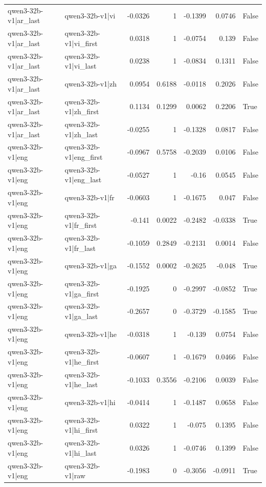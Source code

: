 \begin{table}
\begin{tabular}{l l r r r r l}
qwen3-32b-v1|ar_last & qwen3-32b-v1|vi & -0.0326 & 1 & -0.1399 & 0.0746 & False \\
qwen3-32b-v1|ar_last & qwen3-32b-v1|vi_first & 0.0318 & 1 & -0.0754 & 0.139 & False \\
qwen3-32b-v1|ar_last & qwen3-32b-v1|vi_last & 0.0238 & 1 & -0.0834 & 0.1311 & False \\
qwen3-32b-v1|ar_last & qwen3-32b-v1|zh & 0.0954 & 0.6188 & -0.0118 & 0.2026 & False \\
qwen3-32b-v1|ar_last & qwen3-32b-v1|zh_first & 0.1134 & 0.1299 & 0.0062 & 0.2206 & True \\
qwen3-32b-v1|ar_last & qwen3-32b-v1|zh_last & -0.0255 & 1 & -0.1328 & 0.0817 & False \\
qwen3-32b-v1|eng & qwen3-32b-v1|eng_first & -0.0967 & 0.5758 & -0.2039 & 0.0106 & False \\
qwen3-32b-v1|eng & qwen3-32b-v1|eng_last & -0.0527 & 1 & -0.16 & 0.0545 & False \\
qwen3-32b-v1|eng & qwen3-32b-v1|fr & -0.0603 & 1 & -0.1675 & 0.047 & False \\
qwen3-32b-v1|eng & qwen3-32b-v1|fr_first & -0.141 & 0.0022 & -0.2482 & -0.0338 & True \\
qwen3-32b-v1|eng & qwen3-32b-v1|fr_last & -0.1059 & 0.2849 & -0.2131 & 0.0014 & False \\
qwen3-32b-v1|eng & qwen3-32b-v1|ga & -0.1552 & 0.0002 & -0.2625 & -0.048 & True \\
qwen3-32b-v1|eng & qwen3-32b-v1|ga_first & -0.1925 & 0 & -0.2997 & -0.0852 & True \\
qwen3-32b-v1|eng & qwen3-32b-v1|ga_last & -0.2657 & 0 & -0.3729 & -0.1585 & True \\
qwen3-32b-v1|eng & qwen3-32b-v1|he & -0.0318 & 1 & -0.139 & 0.0754 & False \\
qwen3-32b-v1|eng & qwen3-32b-v1|he_first & -0.0607 & 1 & -0.1679 & 0.0466 & False \\
qwen3-32b-v1|eng & qwen3-32b-v1|he_last & -0.1033 & 0.3556 & -0.2106 & 0.0039 & False \\
qwen3-32b-v1|eng & qwen3-32b-v1|hi & -0.0414 & 1 & -0.1487 & 0.0658 & False \\
qwen3-32b-v1|eng & qwen3-32b-v1|hi_first & 0.0322 & 1 & -0.075 & 0.1395 & False \\
qwen3-32b-v1|eng & qwen3-32b-v1|hi_last & 0.0326 & 1 & -0.0746 & 0.1399 & False \\
qwen3-32b-v1|eng & qwen3-32b-v1|raw & -0.1983 & 0 & -0.3056 & -0.0911 & True \\

\end{tabular}
\end{table}
